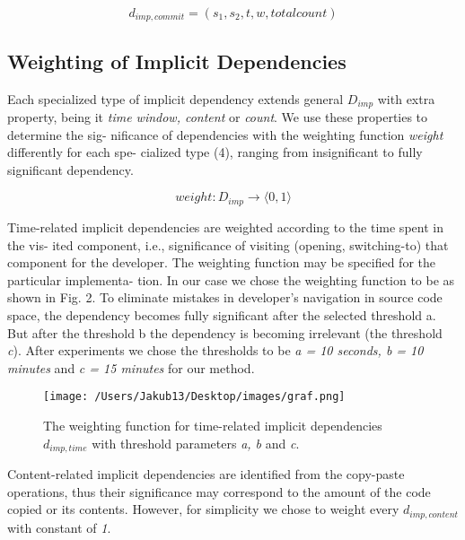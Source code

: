 \documentclass[a4paper]{llncs}
\begin{document}
 \begin{equation}
 d_{imp,commit} = (s_{1},s_{2},t,w,total count)
 \label{vzorec3}
 \end{equation}
 
 \subsection{Weighting of Implicit Dependencies}
 Each specialized type of implicit dependency extends general \textit{$D_{imp}$} with extra property, being it \textit{time window, content} or \textit{count}. We use these properties to determine the sig- nificance of dependencies with the weighting function \textit{weight} differently for each spe- cialized type (4), ranging from insignificant to fully significant dependency.
 
 \newpage
 \begin{equation}
 weight : D_{imp}\rightarrow\langle0,1\rangle
 \label{vzorec4}
 \end{equation}
 
\noindent Time-related implicit dependencies are weighted according to the time spent in the vis- ited component, i.e., significance of visiting (opening, switching-to) that component for the developer. The weighting function may be specified for the particular implementa- tion. In our case we chose the weighting function to be as shown in Fig. 2. To eliminate mistakes in developer’s navigation in source code space, the dependency becomes fully significant after the selected threshold a. But after the threshold b the dependency is becoming irrelevant (the threshold \textit{c}). After experiments we chose the thresholds to be \textit{a = 10 seconds, b = 10 minutes} and \textit{c = 15 minutes} for our method.

\begin{figure}
\centering
\texttt{[image: /Users/Jakub13/Desktop/images/graf.png]}

\caption{The weighting function for time-related implicit dependencies \textit{$d_{imp,time}$} with threshold parameters \textit{a, b} and \textit{c}.}
\end{figure}

\noindent Content-related implicit dependencies are identified from the copy-paste operations, thus their significance may correspond to the amount of the code copied or its contents. However, for simplicity we chose to weight every \textit{$d_{imp,content}$} with constant of \textit{1}.
\end{document}
